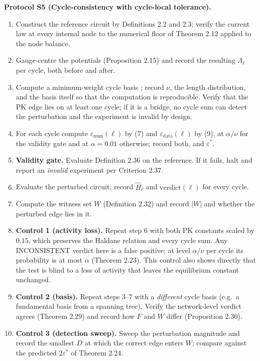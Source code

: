 \documentclass[11pt,a4paper]{article}
\theoremstyle{definition}
\theoremstyle{remark}
\newcommand{\abs}[1]{\lvert#1\rvert}
\newcommand{\eps}{\varepsilon}
\newcommand{\epsnum}{\eps_{\mathrm{num}}}
\newcommand{\epsdata}{\eps_{\mathrm{data}}}
\newcommand{\epsstar}{\eps^{\ast}}
\newcommand{\hol}{H}
\begin{document}
\par\noindent\textbf{Protocol S5 (Cycle-consistency with cycle-local tolerance).} 
\leavevmode
\begin{enumerate}[leftmargin=1.5em,itemsep=3pt]
\item Construct the reference circuit by
Definitions 2.2 and 2.3; verify the current law at every internal
node to the numerical floor of Theorem 2.12 applied to the
node balance.
\item Gauge-centre the potentials (Proposition 2.15) and record the
resulting $\Lambda_\ell$ per cycle, both before and after.
\item Compute a minimum-weight cycle basis \citep{horton1987}; record
$\nu$, the length distribution, and the basis itself so that the
computation is reproducible. Verify that the PK edge lies on at least
one cycle; if it is a bridge, no cycle sum can detect the perturbation
and the experiment is invalid by design.
\item For each cycle compute $\epsnum(\ell)$ by (7)
and $\epsdata(\ell)$ by (9), at $\alpha/\nu$ for the
validity gate and at $\alpha=0.01$ otherwise; record both, and
$\epsstar$.
\item \textbf{Validity gate.} Evaluate Definition 2.36 on the
reference. If it fails, halt and report an \emph{invalid} experiment per
Criterion 2.37.
\item Evaluate the perturbed circuit; record $\widehat{\hol}_\ell$ and
$\mathrm{verdict}(\ell)$ for every cycle.
\item Compute the witness set $W$ (Definition 2.32) and record
$\abs{W}$ and whether the perturbed edge lies in it.
\item \textbf{Control 1 (activity loss).} Repeat step 6 with both PK
constants scaled by $0.15$, which preserves the Haldane relation and
every cycle sum. Any \textsf{INCONSISTENT} verdict here is a false
positive; at level $\alpha/\nu$ per cycle its probability is at most
$\alpha$ (Theorem 2.23). This control also shows
directly that the test is blind to a loss of activity that leaves the
equilibrium constant unchanged.
\item \textbf{Control 2 (basis).} Repeat steps 3--7 with a
\emph{different} cycle basis (e.g.\ a fundamental basis from a spanning
tree). Verify the network-level verdict agrees
(Theorem 2.29) and record how $F$ and $W$ differ
(Proposition 2.30).
\item \textbf{Control 3 (detection sweep).} Sweep the perturbation
magnitude and record the smallest $D$ at which the correct edge enters
$W$; compare against the predicted $2\epsstar$ of
Theorem 2.24.
\end{enumerate}
\par
\end{document}
